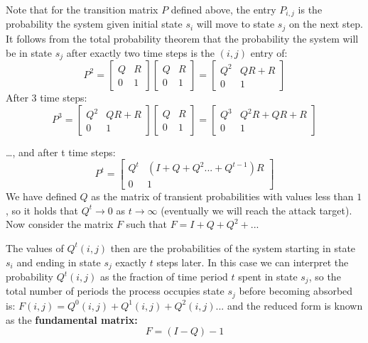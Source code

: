 Note that for the transition matrix \(P\) defined above, the entry \(P_{i, j}\) is the probability the system given initial state \(s_i\) will move to state \(s_j\) on the next step. It follows from the total probability theorem that the probability the system will be in state \(s_j\) after exactly two time steps is the \((i, j)\) entry of:  
\[
P^2=
\begin{bmatrix}
Q & R \\
0 & 1
\end{bmatrix}
\begin{bmatrix}
Q & R \\
0 & 1
\end{bmatrix}=
\begin{bmatrix}
Q^2 & QR + R \\
0 & 1
\end{bmatrix}
\]
After 3 time steps:
\[
P^3=
\begin{bmatrix}
Q^2 & QR + R \\
0 & 1
\end{bmatrix}
\begin{bmatrix}
Q & R \\
0 & 1
\end{bmatrix}=
\begin{bmatrix}
Q^3 & Q^2R +QR + R \\
0 & 1
\end{bmatrix}
\]

 
 …, and after t time steps: 
 \[
P^t=
\begin{bmatrix}
Q^t & (I + Q +Q^2 ... +Q^{t-1}) R \\
0 & 1
\end{bmatrix}
\]
 We have defined \(Q\) as the matrix of transient probabilities with values less than \(1\), so it holds that \(Q^t \to 0\) as \(t \to \infty\)
(eventually we will reach the attack target). Now consider the matrix  \(F\) such that \( F= I + Q + Q^2 +...\)

The values of \(Q^t(i,j)\)  then are the probabilities of the system starting in state \(s_i\) and ending in state \(s_j\) exactly \(t\) steps later. In this case we can interpret the probability \(Q^t(i,j)\)
  as the fraction of time period \(t\) spent in state \(s_j\), so the total number of periods the process occupies state \(s_j\) before becoming absorbed is:  \(F(i, j) = Q^0(i,j)+Q^1(i,j)+Q^2(i,j)...\) and the reduced form is known as the \textbf{fundamental matrix:}
\[ F = (I-Q)-1\] 



